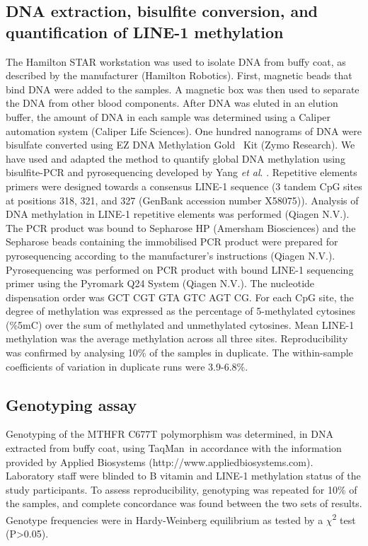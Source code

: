 \subsection{DNA extraction, bisulfite conversion, and quantification of LINE-1 methylation} %
\noindent The Hamilton STAR workstation was used to isolate DNA from buffy coat, as described by the manufacturer (Hamilton Robotics). First, magnetic beads that bind DNA were added to the samples. A magnetic box was then used to separate the DNA from other blood components. After DNA was eluted in an elution buffer, the amount of DNA in each sample was determined using a Caliper automation system (Caliper Life Sciences). One hundred nanograms of DNA were bisulfate converted using EZ DNA Methylation Gold\texttrademark~ Kit (Zymo Research). We have used and adapted the method to quantify global DNA methylation using bisulfite-PCR and pyrosequencing developed by Yang \emph{et al}. \cite{c328}. Repetitive elements primers were designed towards a consensus LINE-1 sequence (3 tandem CpG sites at positions 318, 321, and 327 (GenBank accession number X58075)). Analysis of DNA methylation in LINE-1 repetitive elements was performed (Qiagen N.V.). The PCR product was bound to Sepharose HP (Amersham Biosciences) and 
the Sepharose beads containing the immobilised PCR product were prepared for pyrosequencing according to the manufacturer's instructions (Qiagen N.V.). Pyrosequencing was performed on PCR product with bound LINE-1 sequencing primer using the Pyromark Q24 System (Qiagen N.V.). The nucleotide dispensation order was GCT CGT GTA GTC AGT CG. For each CpG site, the degree of methylation was expressed as the percentage of 5-methylated cytosines (\%5mC) over the sum of methylated and unmethylated cytosines. Mean LINE-1 methylation was the average methylation across all three sites. Reproducibility was confirmed by analysing 10\% of the samples in duplicate. The within-sample coefficients of variation in duplicate runs were 3.9-6.8\%.

\subsection{Genotyping assay} %
\noindent Genotyping of the MTHFR C677T polymorphism was determined, in DNA extracted from buffy coat, using TaqMan\textregistered~in accordance with the information provided by Applied Biosystems (http://www.appliedbiosystems.com). Laboratory staff were blinded to B vitamin and LINE-1 methylation status of the study participants. To assess reproducibility, genotyping was repeated for 10\% of the samples, and complete concordance was found between the two sets of results. Genotype frequencies were in Hardy-Weinberg equilibrium as tested by a $\chi$\textsuperscript{2} test (P>0.05).

